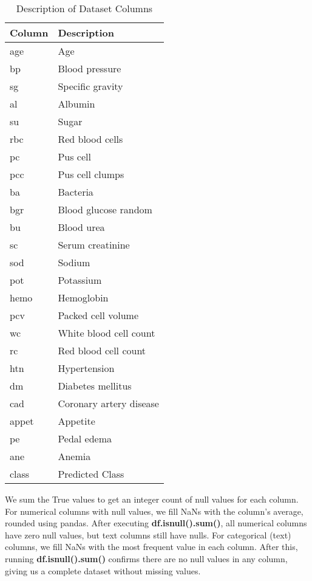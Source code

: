 \documentclass[conference]{IEEEtran}
\begin{document}
\begin{table}[htbp]
\centering
\caption{Description of Dataset Columns}
\label{tab:dataset}
\begin{tabular}{|p{2.5cm}|p{5.5cm}|}
\hline
\textbf{Column} & \textbf{Description} \\
\hline
age & Age \\
bp & Blood pressure \\
sg & Specific gravity \\
al & Albumin \\
su & Sugar \\
rbc & Red blood cells \\
pc & Pus cell \\
pcc & Pus cell clumps \\
ba & Bacteria \\
bgr & Blood glucose random \\
bu & Blood urea \\
sc & Serum creatinine \\
sod & Sodium \\
pot & Potassium \\
hemo & Hemoglobin \\
pcv & Packed cell volume \\
wc & White blood cell count \\
rc & Red blood cell count \\
htn & Hypertension \\
dm & Diabetes mellitus \\
cad & Coronary artery disease \\
appet & Appetite \\
pe & Pedal edema \\
ane & Anemia \\
class & Predicted Class \\
\hline
\end{tabular}
\end{table}

We sum the True values to get an integer count of null values for each column. For numerical columns with null values, we fill NaNs with the column's average, rounded using pandas. After executing \textbf{df.isnull().sum()}, all numerical columns have zero null values, but text columns still have nulls. For categorical (text) columns, we fill NaNs with the most frequent value in each column. After this, running \textbf{df.isnull().sum()} confirms there are no null values in any column, giving us a complete dataset without missing values.
\end{document}
